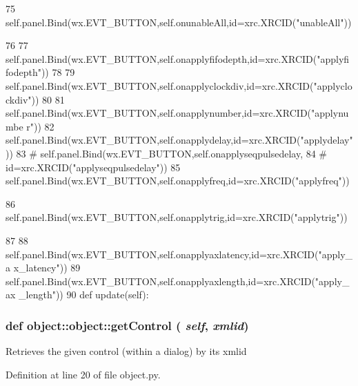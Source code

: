 \begin{DoxyCode}
75         self.panel.Bind(wx.EVT_BUTTON,self.onunableAll,id=xrc.XRCID("unableAll"))
      
76 
77         self.panel.Bind(wx.EVT_BUTTON,self.onapplyfifodepth,id=xrc.XRCID("applyfi
      fodepth"))
78 
79         self.panel.Bind(wx.EVT_BUTTON,self.onapplyclockdiv,id=xrc.XRCID("applyclo
      ckdiv"))
80 
81         self.panel.Bind(wx.EVT_BUTTON,self.onapplynumber,id=xrc.XRCID("applynumbe
      r"))
82         self.panel.Bind(wx.EVT_BUTTON,self.onapplydelay,id=xrc.XRCID("applydelay"
      ))
83 #        self.panel.Bind(wx.EVT_BUTTON,self.onapplyseqpulsedelay,
84 #                        id=xrc.XRCID("applyseqpulsedelay"))
85         self.panel.Bind(wx.EVT_BUTTON,self.onapplyfreq,id=xrc.XRCID("applyfreq"))
      
86         self.panel.Bind(wx.EVT_BUTTON,self.onapplytrig,id=xrc.XRCID("applytrig"))
      
87 
88         self.panel.Bind(wx.EVT_BUTTON,self.onapplyaxlatency,id=xrc.XRCID("apply_a
      x_latency"))
89         self.panel.Bind(wx.EVT_BUTTON,self.onapplyaxlength,id=xrc.XRCID("apply_ax
      _length"))
90 
    def update(self):
\end{DoxyCode}
\hypertarget{classobject_1_1object_ac765747a2b581d48eeb94e600c31fc3f}{
\subsubsection[{getControl}]{\setlength{\rightskip}{0pt plus 5cm}def object::object::getControl ( {\em self}, \/   {\em xmlid})}}
\label{classobject_1_1object_ac765747a2b581d48eeb94e600c31fc3f}
\begin{DoxyVerb}Retrieves the given control (within a dialog) by its xmlid\end{DoxyVerb}
 

Definition at line 20 of file object.py.



